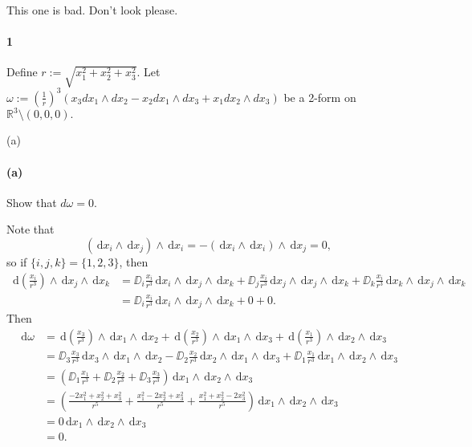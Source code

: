 \documentclass[12pt]{article}
\newenvironment{fullbox}{\begin{lrbox}{\savefullbox}\begin{minipage}{\dimexpr\textwidth-2\fboxsep\relax}}{\end{minipage}\end{lrbox}\begin{center}\framebox[\textwidth]{\usebox{\savefullbox}}\end{center}}
\newenvironment{pbox}[1][]{\begin{fullbox}\ifx#1\empty\else\paragraph{#1}\fi}{\end{fullbox}}
\newcommand{\<}{\langle}
\renewcommand{\>}{\rangle}
\newcommand{\dd}[1]{\,\mathrm{d}#1}
\newcommand{\DD}[1]{\,\mathrm{D}#1}
\newcommand{\of}[1]{\!\left(#1\right)}
\begin{document}
\thispagestyle{title}

This one is bad. Don't look please.

\newpage
\begin{pbox}[1]
    Define $r := \sqrt{x_1^2+x_2^2+x_3^2}$. Let $\omega := (\frac{1}{r})^3 (x_3 dx_1 \wedge dx_2 - x_2 dx_1 \wedge dx_3 + x_1 dx_2 \wedge dx_3)$ be a 2-form on $\mathbb R^3\setminus (0,0,0).$
\end{pbox}

\begin{pbox}[(a)]
    Show that $d\omega = 0.$
\end{pbox}

Note that
\[
    (\dd{x_i} \wedge \dd{x_j}) \wedge \dd{x_i}
        = -(\dd{x_i} \wedge \dd{x_i}) \wedge \dd{x_j}
        = 0,
\]
so if $\{i, j, k\} = \{1, 2, 3\}$, then
\begin{align*}
    \dd{\of{\frac{x_i}{r^3}}} \wedge \dd{x_j} \wedge \dd{x_k}
        &= \DD_i\frac{x_i}{r^3} \dd{x_i} \wedge \dd{x_j} \wedge \dd{x_k}
            + \DD_j\frac{x_i}{r^3} \dd{x_j} \wedge \dd{x_j} \wedge \dd{x_k}
            + \DD_k\frac{x_i}{r^3} \dd{x_k} \wedge \dd{x_j} \wedge \dd{x_k} \\
        &= \DD_i\frac{x_i}{r^3} \dd{x_i} \wedge \dd{x_j} \wedge \dd{x_k} + 0 + 0.
\end{align*}
Then
\begin{align*}
    \dd{\omega}
        &= \dd{\of{\frac{x_3}{r^3}}} \wedge \dd{x_1} \wedge \dd{x_2}
            + \dd{\of{\frac{x_2}{r^3}}} \wedge \dd{x_1} \wedge \dd{x_3}
            + \dd{\of{\frac{x_1}{r^3}}} \wedge \dd{x_2} \wedge \dd{x_3} \\
        &= \DD_3 \frac{x_3}{r^3} \dd{x_3} \wedge \dd{x_1} \wedge \dd{x_2}
            - \DD_2 \frac{x_2}{r^3} \dd{x_2} \wedge \dd{x_1} \wedge \dd{x_3}
            + \DD_1 \frac{x_1}{r^3} \dd{x_1} \wedge \dd{x_2} \wedge \dd{x_3} \\
        &= \left(\DD_1 \frac{x_1}{r^3} 
            + \DD_2 \frac{x_2}{r^3} 
            + \DD_3 \frac{x_3}{r^3}\right) \dd{x_1} \wedge \dd{x_2} \wedge \dd{x_3} \\
        &= \left(\frac{-2x_1^2 + x_2^2 + x_3^2}{r^5} 
            + \frac{x_1^2 - 2x_2^2 + x_3^2}{r^5}
            + \frac{x_1^2 + x_2^2 - 2x_3^2}{r^5}\right) \dd{x_1} \wedge \dd{x_2} \wedge \dd{x_3} \\
        &= 0 \dd{x_1} \wedge \dd{x_2} \wedge \dd{x_3} \\
        &= 0.
\end{align*}
\end{document}
